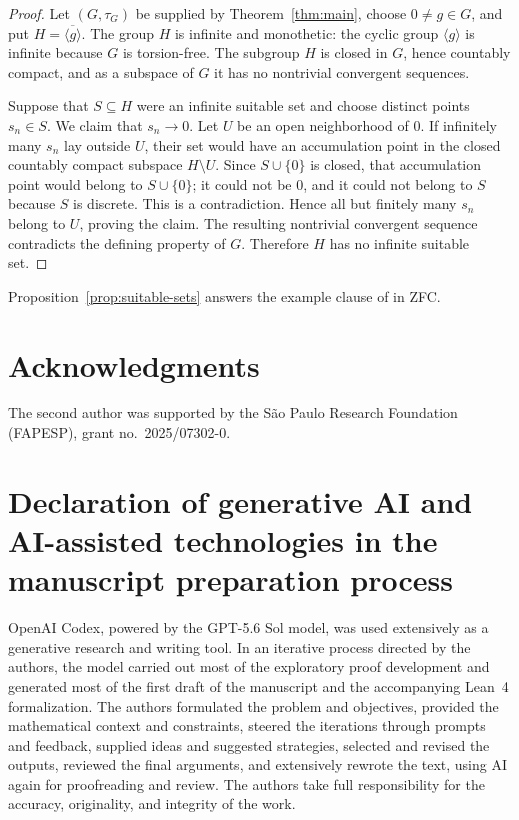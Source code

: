\documentclass[11pt]{amsart}
\theoremstyle{definition}
\begin{document}
\begin{proof}
Let $(G,\tau_G)$ be supplied by Theorem~\ref{thm:main}, choose $0\neq g\in G$,
and put $H=\overline{\langle g\rangle}$.  The group $H$ is infinite and
monothetic: the cyclic group $\langle g\rangle$ is infinite because $G$ is
torsion-free.  The subgroup $H$ is closed in $G$, hence countably compact, and
as a subspace of $G$ it has no nontrivial convergent sequences.

Suppose that $S\subseteq H$ were an infinite suitable set and choose distinct
points $s_n\in S$.  We claim that $s_n\to0$.  Let $U$ be an open neighborhood
of $0$.  If infinitely many $s_n$ lay outside $U$, their set would have an
accumulation point in the closed countably compact subspace $H\setminus U$.
Since $S\cup\{0\}$ is closed, that accumulation point would belong to
$S\cup\{0\}$; it could not be $0$, and it could not belong to $S$ because
$S$ is discrete.  This is a contradiction.  Hence all but finitely many
$s_n$ belong to $U$, proving the claim.  The resulting nontrivial convergent
sequence contradicts the defining property of $G$.  Therefore $H$ has no
infinite suitable set.
\end{proof}

Proposition~\ref{prop:suitable-sets} answers the example clause of
\cite[Question~5.4]{Dikranjan1999} in ZFC.

\section*{Acknowledgments}

The second author was supported by the S\~ao Paulo Research Foundation
(FAPESP), grant no.~2025/07302-0.

\section*{Declaration of generative AI and AI-assisted technologies in the
manuscript preparation process}

OpenAI Codex, powered by the GPT-5.6 Sol model, was used extensively as a
generative research and writing tool.  In an iterative process directed by the
authors, the model carried out most of the exploratory proof development and
generated most of the first draft of the manuscript and the accompanying Lean~4
formalization.  The authors formulated the problem and objectives, provided
the mathematical context and constraints, steered the iterations through
prompts and feedback, supplied ideas and suggested strategies, selected and
revised the outputs, reviewed the final arguments, and extensively rewrote the
text, using AI again for proofreading and review.  The authors take full
responsibility for the accuracy,
originality, and integrity of the work.
\end{document}
